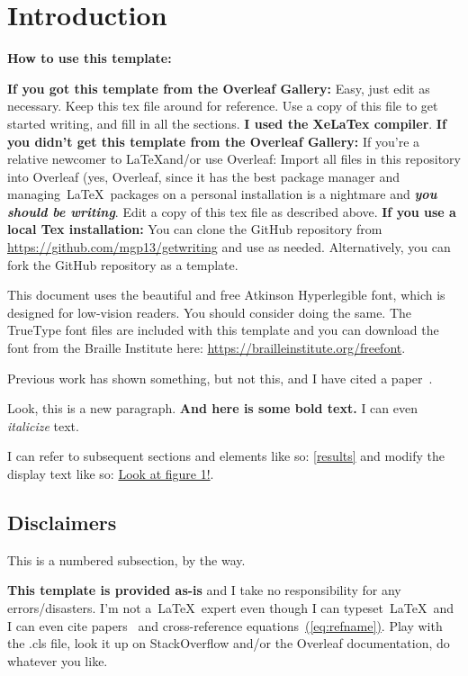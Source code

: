 \documentclass{getwriting}
\begin{document}
\section{Introduction}
\textbf{How to use this template: }
\begin{outline}[enumerate]
\1 \textbf{If you got this template from the Overleaf Gallery:}
Easy, just edit as necessary. Keep this tex file around for reference. Use a copy of this file to get started writing, and fill in all the sections. \textbf{I used the XeLaTex compiler}. 
\1 \textbf{If you didn't get this template from the Overleaf Gallery:}
\2 If you're a relative newcomer to \LaTeX and/or use Overleaf:
Import all files in this repository into Overleaf (yes, Overleaf, since it has the best package manager and managing~\LaTeX~packages on a personal installation is a nightmare and \textit{\textbf{you should be writing}}. Edit a copy of this tex file as described above.
\2 \textbf{If you use a local Tex installation:}
You can clone the GitHub repository from \url{https://github.com/mgp13/getwriting} and use as needed. Alternatively, you can fork the GitHub repository as a template.
\end{outline}
\par
This document uses the beautiful and free Atkinson Hyperlegible font, which is designed for low-vision readers. You should consider doing the same. The TrueType font files are included with this template and you can download the font from the Braille Institute here: \url{https://brailleinstitute.org/freefont}.
\par
Previous work has shown something, but not this, and I have cited a paper~\cite{scbonita}. 
\par
Look, this is a new paragraph. \textbf{And here is some bold text.} I can even \textit{italicize} text.
\par
I can refer to subsequent sections and elements like so: \hyperref[results]{\autoref{results}} and modify the display text like so: \hyperref[fig:figure1]{Look at figure 1!}.
\par
\subsection{Disclaimers}
This is a numbered subsection, by the way.
\par
\textbf{This template is provided as-is} and I take no responsibility for any errors/disasters. I'm not a~\LaTeX~expert even though I can typeset~\LaTeX~and I can even cite papers~\cite{scbonita} and cross-reference equations~\hyperref[eq:refname]{(\autoref{eq:refname})}. Play with the .cls file, look it up on StackOverflow and/or the Overleaf documentation, do whatever you like.
\end{document}
